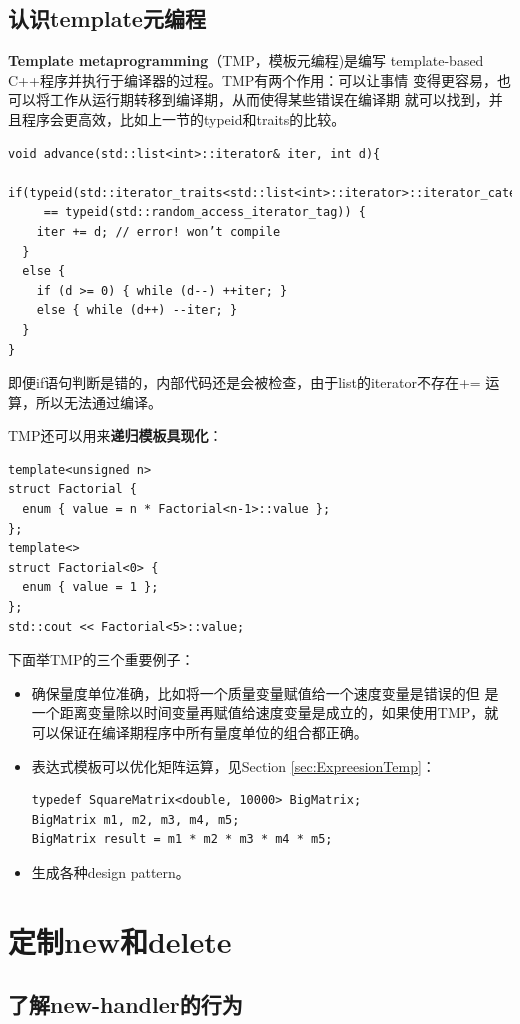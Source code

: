 \subsection{认识template元编程}
\label{sec:Item-48}

\textbf{Template metaprogramming}（TMP，模板元编程)是编写
template-based C++程序并执行于编译器的过程。TMP有两个作用：可以让事情
变得更容易，也可以将工作从运行期转移到编译期，从而使得某些错误在编译期
就可以找到，并且程序会更高效，比如上一节的typeid和traits的比较。

\begin{verbatim}
void advance(std::list<int>::iterator& iter, int d){
  if(typeid(std::iterator_traits<std::list<int>::iterator>::iterator_category)
     == typeid(std::random_access_iterator_tag)) {
    iter += d; // error! won’t compile
  }
  else {
    if (d >= 0) { while (d--) ++iter; }
    else { while (d++) --iter; }
  }
}
\end{verbatim}

即便if语句判断是错的，内部代码还是会被检查，由于list的iterator不存在+=
运算，所以无法通过编译。

TMP还可以用来\textbf{递归模板具现化}：
\begin{verbatim}
template<unsigned n> 
struct Factorial {
  enum { value = n * Factorial<n-1>::value };
};
template<>
struct Factorial<0> {
  enum { value = 1 };
};
std::cout << Factorial<5>::value;
\end{verbatim}

下面举TMP的三个重要例子：
\begin{itemize}
\item 确保量度单位准确，比如将一个质量变量赋值给一个速度变量是错误的但
  是一个距离变量除以时间变量再赋值给速度变量是成立的，如果使用TMP，就
  可以保证在编译期程序中所有量度单位的组合都正确。
\item 表达式模板可以优化矩阵运算，见Section \ref{sec:ExpreesionTemp}：
\begin{verbatim}
typedef SquareMatrix<double, 10000> BigMatrix;
BigMatrix m1, m2, m3, m4, m5;
BigMatrix result = m1 * m2 * m3 * m4 * m5; 
\end{verbatim}
\item 生成各种design pattern。
\end{itemize}

\clearpage
\section{定制new和delete}

\subsection{了解new-handler的行为}
\label{sec:Item-49}

